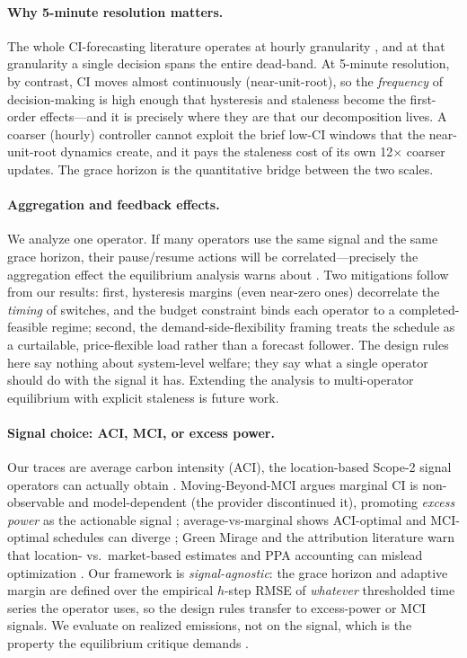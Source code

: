 \documentclass[sigconf,nonacm=false]{acmart}
\begin{document}
\paragraph{Why 5-minute resolution matters.}
The whole CI-forecasting literature operates at hourly granularity
\cite{maji2022dacf,maji2023carboncast,yan2025ensembleci,maji2025carbonx}, and at
that granularity a single decision spans the entire dead-band. At 5-minute
resolution, by contrast, CI moves almost continuously (near-unit-root), so the
\emph{frequency} of decision-making is high enough that hysteresis and staleness
become the first-order effects---and it is precisely where they are that our
decomposition lives. A coarser (hourly) controller cannot exploit the brief
low-CI windows that the near-unit-root dynamics create, and it pays the
staleness cost of its own 12$\times$ coarser updates. The grace horizon is the
quantitative bridge between the two scales.

\paragraph{Aggregation and feedback effects.}
We analyze one operator. If many operators use the same signal and the same
grace horizon, their pause/resume actions will be correlated---precisely the
aggregation effect the equilibrium analysis warns about
\cite{jiang2026equilibrium}. Two mitigations follow from our results: first,
hysteresis margins (even near-zero ones) decorrelate the \emph{timing} of
switches, and the budget constraint binds each operator to a completed-feasible
regime; second, the demand-side-flexibility framing treats the schedule as a
curtailable, price-flexible load rather than a forecast follower. The design
rules here say nothing about system-level welfare; they say what a single
operator should do with the signal it has. Extending the analysis to
multi-operator equilibrium with explicit staleness is future work.

\paragraph{Signal choice: ACI, MCI, or excess power.}
Our traces are average carbon intensity (ACI), the location-based Scope-2
signal operators can actually obtain \cite{electricitymaps}. Moving-Beyond-MCI
argues marginal CI is non-observable and model-dependent (the provider
discontinued it), promoting \emph{excess power} as the actionable signal
\cite{wiesner2025beyondmci}; average-vs-marginal shows ACI-optimal and
MCI-optimal schedules can diverge \cite{sukprasert2024avm}; Green Mirage and
the attribution literature warn that location- vs.\ market-based estimates and
PPA accounting can mislead optimization \cite{maji2024greenmirage,
maji2024untangling}. Our framework is \emph{signal-agnostic}: the grace
horizon and adaptive margin are defined over the empirical $h$-step RMSE of
\emph{whatever} thresholded time series the operator uses, so the design rules
transfer to excess-power or MCI signals. We evaluate on realized emissions,
not on the signal, which is the property the equilibrium critique demands
\cite{jiang2026equilibrium}.
\end{document}

